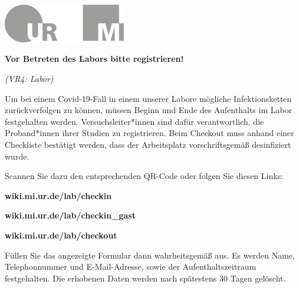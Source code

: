 \documentclass[24pt, a4paper, portrait]{article}
\begin{document}
\pagestyle{empty}

\raggedleft

\includegraphics[width=0.4\textwidth]{logo}

\vspace{1cm}
\sffamily
\centering
\huge

\textbf{Vor Betreten des Labors bitte registrieren!}

\vspace{0.5cm}
\Large
\textit{(VR4: Labor)}
\vspace{0.5cm}

\raggedright

Um bei einem Covid-19-Fall in einem unserer Labore mögliche Infektionsketten zurückverfolgen zu können, müssen Beginn und Ende des Aufenthalts im Labor festgehalten werden.
Versuchsleiter*innen sind dafür verantwortlich, die Proband*innen ihrer Studien zu registrieren.
Beim Checkout muss anhand einer Checkliste bestätigt werden, dass der Arbeitsplatz vorschriftsgemäß desinfiziert wurde.

\medskip

Scannen Sie dazu den entsprechenden QR-Code oder folgen Sie diesen Links:

\textbf{wiki.mi.ur.de/lab/checkin}

\textbf{wiki.mi.ur.de/lab/checkin\_gast}

\textbf{wiki.mi.ur.de/lab/checkout}

\medskip

Füllen Sie das angezeigte Formular dann wahrheitsgemäß aus.
Es werden Name, Telephonnummer und E-Mail-Adresse, sowie der Aufenthaltszeitraum festgehalten.
Die erhobenen Daten werden nach spätestens 30 Tagen gelöscht.

\vspace{1cm}
\centering
\end{document}
